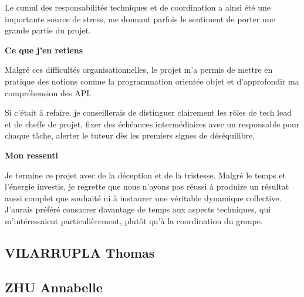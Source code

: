 \documentclass[a4paper,12pt]{article}
\begin{document}
Le cumul des responsabilités techniques et de coordination a ainsi été
une importante source de stress, me donnant parfois le sentiment de
porter une grande partie du projet.

\textbf{Ce que j'en retiens}

Malgré ces difficultés organisationnelles, le projet m'a permis de
mettre en pratique des notions comme la programmation orientée objet et
d'approfondir ma compréhension des API.

Si c'était à refaire, je conseillerais de distinguer clairement les
rôles de tech lead et de cheffe de projet, fixer des échéances
intermédiaires avec un responsable pour chaque tâche, alerter le tuteur
dès les premiers signes de déséquilibre.

\textbf{Mon ressenti}

Je termine ce projet avec de la déception et de la tristesse. Malgré le
temps et l'énergie investis, je regrette que nous n'ayons pas réussi à
produire un résultat aussi complet que souhaité ni à instaurer une
véritable dynamique collective. J'aurais préféré consacrer davantage de
temps aux aspects techniques, qui m'intéressaient particulièrement,
plutôt qu'à la coordination du groupe.

\newpage{}

\subsection*{VILARRUPLA Thomas}\label{vilarrupla-thomas}

\newpage{}

\subsection*{ZHU Annabelle}\label{zhu-annabelle}
\end{document}
